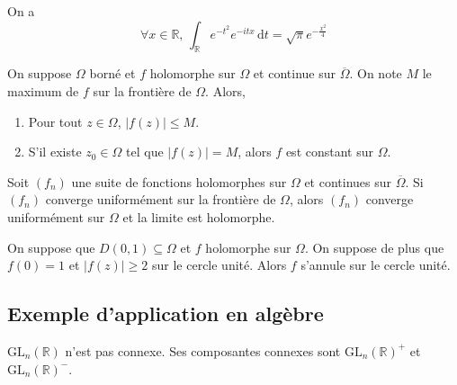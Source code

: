 
  \begin{application}
    On a
    \[ \forall x \in \mathbb{R}, \, \int_{\mathbb{R}} e^{-t^2} e^{-itx} \, \mathrm{d}t = \sqrt{\pi} e^{-\frac{x^2}{4}} \]
  \end{application}


  \begin{theorem}
    On suppose $\Omega$ borné et $f$ holomorphe sur $\Omega$ et continue sur $\overline{\Omega}$. On note $M$ le maximum de $f$ sur la frontière de $\Omega$. Alors,
    \begin{enumerate}[label=(\roman*)]
      \item Pour tout $z \in \Omega$, $\vert f(z) \vert \leq M$.
      \item S'il existe $z_0 \in \Omega$ tel que $\vert f(z) \vert = M$, alors $f$ est constant sur $\Omega$.
    \end{enumerate}
  \end{theorem}


  \begin{application}
    Soit $(f_n)$ une suite de fonctions holomorphes sur $\Omega$ et continues sur $\overline{\Omega}$. Si $(f_n)$ converge uniformément sur la frontière de $\Omega$, alors $(f_n)$ converge uniformément sur $\Omega$ et la limite est holomorphe.
  \end{application}

  \begin{application}
    On suppose que $D(0,1) \subseteq \Omega$ et $f$ holomorphe sur $\Omega$. On suppose de plus que $f(0) = 1$ et $\vert f(z) \vert \geq 2$ sur le cercle unité. Alors $f$ s'annule sur le cercle unité.
  \end{application}

  \subsection{Exemple d'application en algèbre}


  \begin{proposition}
    $\mathrm{GL}_n(\mathbb{R})$ n'est pas connexe. Ses composantes connexes sont $\mathrm{GL}_n(\mathbb{R})^+$ et $\mathrm{GL}_n(\mathbb{R})^-$.
  \end{proposition}

